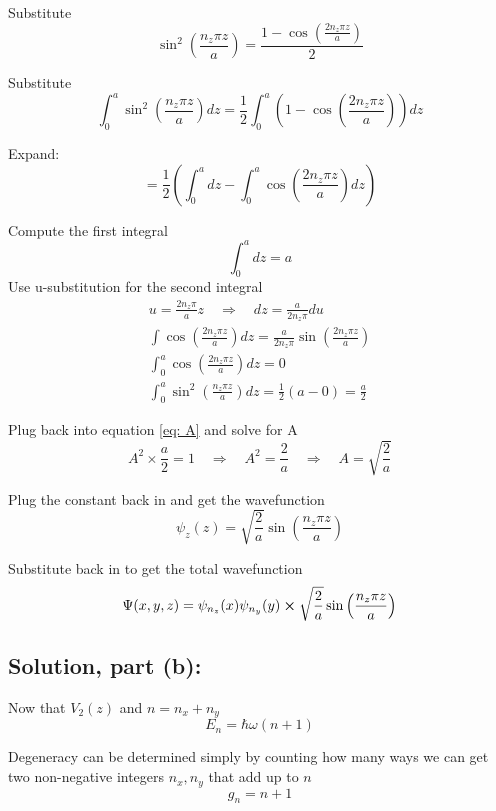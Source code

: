 \documentclass[12pt]{article}
\begin{document}
        Substitute
        \[
            \sin^2\left( \frac{n_z \pi z}{a} \right) = \frac{1 - \cos\left( \frac{2n_z \pi z}{a} \right)}{2}
        \]
        
        Substitute
        \[
            \int_0^a \sin^2\left( \frac{n_z \pi z}{a} \right) dz = \frac{1}{2} \int_0^a \left( 1 - \cos\left( \frac{2n_z \pi z}{a} \right) \right) dz
        \]

        Expand:
        \[
            = \frac{1}{2} \left( \int_0^a dz - \int_0^a \cos\left( \frac{2n_z \pi z}{a} \right) dz \right)
        \]

        Compute the first integral
        \[
            \int_0^a dz = a
        \]
        Use u-substitution for the second integral
        \begin{align*}
            u = \frac{2n_z \pi}{a} z \quad \Rightarrow \quad dz = \frac{a}{2n_z \pi} du \\
            \int \cos\left( \frac{2n_z \pi z}{a} \right) dz = \frac{a}{2n_z \pi} \sin\left( \frac{2n_z \pi z}{a} \right)\\
            \int_0^a \cos\left( \frac{2n_z \pi z}{a} \right) dz = 0 \\
            \int_0^a \sin^2\left( \frac{n_z \pi z}{a} \right) dz = \frac{1}{2} (a - 0) = \frac{a}{2}
        \end{align*}

        Plug back into equation \ref{eq: A} and solve for A
        \[
            A^2 \times \frac{a}{2} = 1 \quad \Rightarrow \quad A^2 = \frac{2}{a} \quad \Rightarrow \quad A = \sqrt{\frac{2}{a}}
        \]

        Plug the constant back in and get the wavefunction
        \[
        \psi_z(z) = \sqrt{\frac{2}{a}} \sin\left( \frac{n_z \pi z}{a} \right)
        \]

        Substitute back in to get the total wavefunction
        \[
            \Psi(x,y,z) = \psi_{n_z}(x) \psi_{n_y}(y) \cross \sqrt{\frac{2}{a}} \sin \left( \frac{n_z \pi z}{a} \right)
        \]

    \subsection{Solution, part (b):}
        Now that $V_2(z)$ and $n=n_x +n_y$
        \[
            E_n = \hbar \omega (n + 1)
        \]

        Degeneracy can be determined simply by counting how many ways we can get two non-negative integers $n_x, n_y$ that add up to $n$
        \[
            g_n = n + 1
        \]
\end{document}
